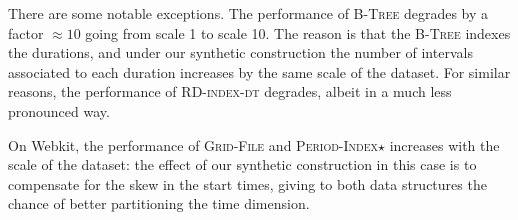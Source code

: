\documentclass[sigconf,nonacm,anonymous]{acmart}
\theoremstyle{definition}
\newcommand{\algo}[1]{\textsc{#1}}
\newcommand{\btree}{\algo{B-Tree}\xspace}
\newcommand{\gfile}{\algo{Grid-File}\xspace}
\newcommand{\pindex}{\algo{Period-Index$\star$}\xspace}
\newcommand{\rddt}{\algo{RD-index-dt}\xspace}
\begin{document}
There are some notable exceptions. The performance of \btree degrades by a factor $\approx 10$ going from scale 1 to scale 10. The reason is that the \btree indexes the durations, and under our synthetic construction the number of intervals associated to each duration increases by the same scale of the dataset.
For similar reasons, the performance of \rddt degrades, albeit in a much less pronounced way.

On Webkit, the performance of \gfile and \pindex increases with the scale of the dataset: the effect of our synthetic construction in this case is to compensate for the skew in the start times, giving to both data structures the chance of better partitioning the time dimension.


% 


\end{document}
